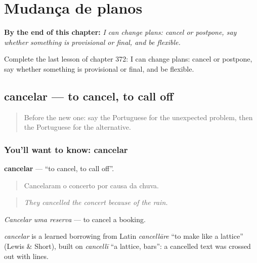 
\chapter{Mudança de planos}
\label{ch:pt-mudanca-de-planos}

\begin{chapteropening}
\textbf{By the end of this chapter:} \emph{I can change plans: cancel or postpone, say whether something is provisional or final, and be flexible.}

Complete the last lesson of chapter 372: I can change plans: cancel or postpone, say whether something is provisional or final, and be flexible.
\end{chapteropening}

\section[cancelar]{cancelar — to cancel, to call off}

\label{lesson:PT-C372-cancelar}



\begin{quote}
Before the new one: say the Portuguese for the unexpected problem, then the Portuguese for the alternative.
\end{quote}

\subsection*{You'll want to know: cancelar}
\textbf{cancelar} — \textquotedblleft{}to cancel, to call off\textquotedblright{}.

\begin{quote}
Cancelaram o concerto por causa da chuva.
\end{quote}

\begin{quote}
\emph{They cancelled the concert because of the rain.}
\end{quote}

\emph{Cancelar uma reserva} — to cancel a booking.

\begin{cousinweb}
\emph{cancelar} is a learned borrowing from Latin \emph{cancellāre} \textquotedblleft{}to make like a lattice\textquotedblright{} (Lewis \& Short), built on \emph{cancellī} \textquotedblleft{}a lattice, bars\textquotedblright{}: a cancelled text was crossed out with lines.
\end{cousinweb}

